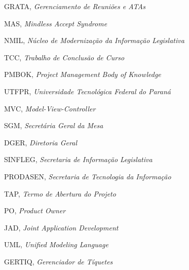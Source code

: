 \begin{siglas}
	\item GRATA, \textit{Gerenciamento de Reuniões e ATAs}
  	\item MAS, \textit{Mindless Accept Syndrome}
  	\item NMIL, \textit{Núcleo de Modernização da Informação Legislativa}
  	\item TCC, \textit{Trabalho de Conclusão de Curso}
  	\item PMBOK, \textit{Project Management Body of Knowledge}
  	\item UTFPR, \textit{Universidade Tecnológica Federal do Paraná}
  	\item MVC, \textit{Model-View-Controller}
  	\item SGM, \textit{Secretária Geral da Mesa}
  	\item DGER, \textit{Diretoria Geral}
  	\item SINFLEG, \textit{Secretaria de Informação Legislativa}
  	\item PRODASEN, \textit{Secretaria de Tecnologia da Informação}
  	\item TAP, \textit{Termo de Abertura do Projeto}
  	\item PO, \textit{Product Owner}
  	\item JAD, \textit{Joint Application Development}
  	\item UML, \textit{Unified Modeling Language}
  	\item GERTIQ, \textit{Gerenciador de Tíquetes}
\end{siglas}